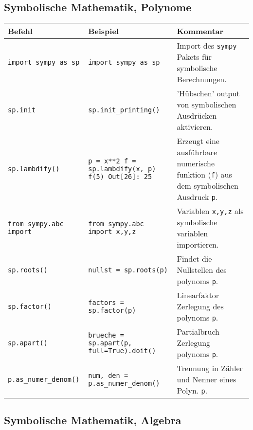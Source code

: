 \subsection*{Symbolische Mathematik, Polynome}
\begin{table}[H]
    \centering
    \begin{tabular}{|p{3cm}|p{6cm}|p{6cm}|}
        \hline
    \textbf{Befehl} & \textbf{Beispiel} & \textbf{Kommentar} \\ \hline
    
    \texttt{import sympy as sp} & \texttt{import sympy as sp} & Import des \texttt{sympy} Pakets für symbolische Berechnungen. \\ \hline
    \texttt{sp.init} & \texttt{sp.init\_printing()} & 'Hübschen' output von symbolischen Ausdrücken aktivieren. \\ \hline
    \texttt{sp.lambdify()} & {\texttt{p = x**2 \newline 
f = sp.lambdify(x, p) \newline
f(5) \newline 
Out[26]: 25
}} & Erzeugt eine ausführbare numerische funktion (\texttt{f}) aus dem symbolischen Ausdruck \texttt{p}. \\ \hline
    \texttt{from sympy.abc import} & \texttt{from sympy.abc import x,y,z} & Variablen \texttt{x,y,z} als symbolische variablen importieren. \\ \hline
    \texttt{sp.roots()} & \texttt{nullst = sp.roots(p)} & Findet die Nullstellen des polynoms \texttt{p}. \\ \hline
    \texttt{sp.factor()} & \texttt{factors = sp.factor(p)} & Linearfaktor Zerlegung des polynoms \texttt{p}. \\ \hline
    \texttt{sp.apart()} & \texttt{brueche = sp.apart(p, full=True).doit()} & Partialbruch Zerlegung polynoms \texttt{p}. \\ \hline
    \texttt{p.as\_numer\_denom()} & \texttt{num, den = p.as\_numer\_denom()} & Trennung in Zähler und Nenner eines Polyn. \texttt{p}. \\ \hline

    \end{tabular}
\end{table}

\subsection*{Symbolische Mathematik, Algebra}

